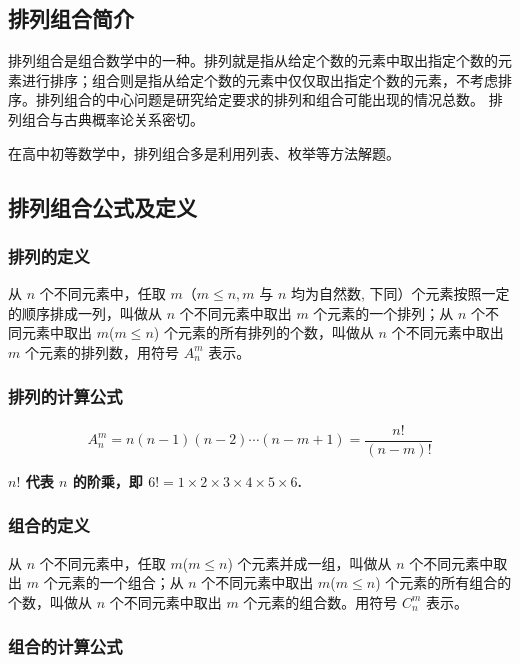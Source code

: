 
\subsection{排列组合简介}

排列组合是组合数学中的一种。排列就是指从给定个数的元素中取出指定个数的元素进行排序；组合则是指从给定个数的元素中仅仅取出指定个数的元素，不考虑排序。排列组合的中心问题是研究给定要求的排列和组合可能出现的情况总数。 排列组合与古典概率论关系密切。

在高中初等数学中，排列组合多是利用列表、枚举等方法解题。

\hr

\subsection{排列组合公式及定义}

\subsubsection{排列的定义}

从 $n$ 个不同元素中，任取 $m$（$m≤n,m$ 与 $n$ 均为自然数, 下同）个元素按照一定的顺序排成一列，叫做从 $n$ 个不同元素中取出 $m$ 个元素的一个排列；从 $n$ 个不同元素中取出 $m$($m≤n$) 个元素的所有排列的个数，叫做从 $n$ 个不同元素中取出 $m$ 个元素的排列数，用符号 $A_n^m$ 表示。

\subsubsection{排列的计算公式}

$$
A_n^m = n(n-1)(n-2) \cdots (n-m+1) = \frac{n!}{(n - m)!}
$$

\textbf{$n!$ 代表 $n$ 的阶乘，即 $6! = 1 \times 2 \times 3 \times 4 \times 5 \times 6$.}

\subsubsection{组合的定义}

从 $n$ 个不同元素中，任取 $m$($m≤n$) 个元素并成一组，叫做从 $n$ 个不同元素中取出 $m$ 个元素的一个组合；从 $n$ 个不同元素中取出 $m$($m≤n$) 个元素的所有组合的个数，叫做从 $n$ 个不同元素中取出 $m$ 个元素的组合数。用符号 $C_n^m$ 表示。

\subsubsection{组合的计算公式}

